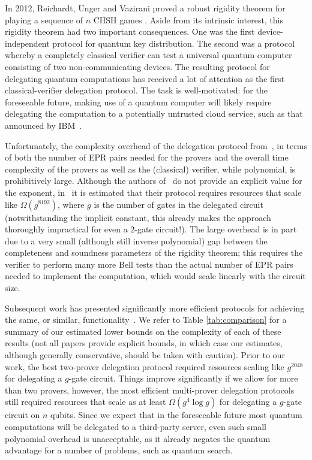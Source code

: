 \documentclass[11pt]{article}
\theoremstyle{remark}
\theoremstyle{definition}
\begin{document}
In 2012, Reichardt, Unger and Vazirani proved a robust rigidity theorem for
playing a sequence of $n$ CHSH games \cite{reichardt2012classical}. Aside from
its intrinsic interest, this rigidity theorem had two important consequences.
One was the first device-independent protocol for quantum key distribution. The
second was a protocol whereby a completely classical verifier can test a
universal quantum computer consisting of two non-communicating devices.  The resulting
 protocol for delegating quantum
computations has received a lot of attention as the first classical-verifier delegation protocol. 
The task is well-motivated: for the foreseeable future, making use of a quantum computer will likely require delegating the computation to a potentially untrusted cloud service, such as that announced by IBM~\cite{ibmcloud}.  

Unfortunately, the complexity overhead of the delegation protocol from~\cite{reichardt2012classical}, in terms of both the number of EPR pairs needed for the provers and the overall time complexity of the provers as well as the (classical) verifier, while polynomial, is prohibitively large. Although the authors of~\cite{reichardt2012classical} do not provide an explicit value for the exponent, in~\cite{hajdusek2015} it is estimated that their protocol requires resources that scale like $\Omega(g^{8192})$, where $g$ is the number of gates in the delegated circuit (notwithstanding the implicit constant, this already makes the approach thoroughly impractical for even a $2$-gate circuit!).
The large overhead is in part due to a very small (although still inverse polynomial) gap between the completeness and soundness parameters of the rigidity theorem; this requires the verifier to perform many more Bell tests than the actual number of EPR pairs needed to implement the computation, which would scale linearly with the circuit size. 

Subsequent work has presented significantly more efficient protocols for achieving the same, or similar,  functionality~\cite{McKague16,Gheorghiu15,hajdusek2015}. We refer to Table \ref{tab:comparison}
for a summary of our estimated lower bounds on the complexity of each of these
results (not all papers provide explicit bounds, in which case our estimates,
although generally conservative, should be taken with caution). Prior to our
work, the best two-prover delegation protocol required resources scaling like
$g^{2048}$ for delegating a $g$-gate circuit. Things improve significantly if we
allow for more than two provers, however, the most efficient multi-prover
delegation protocols still required resources that scale
as at least $\Omega(g^4\log{g})$ for delegating a $g$-gate circuit on $n$ qubits.
Since we expect that in the foreseeable future most quantum computations will be delegated to a third-party server, even such small polynomial overhead is unacceptable, as it already negates the quantum advantage for a number of problems, such as quantum search.
\end{document}
